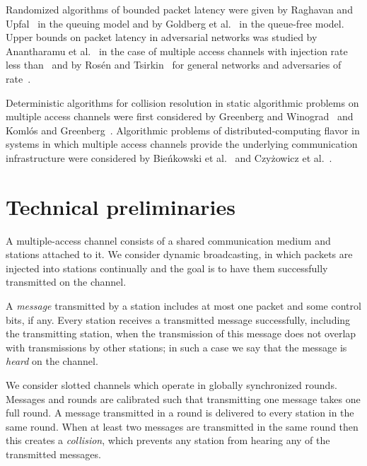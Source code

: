 \documentclass[11pt]{article}
\begin{document}
Randomized algorithms of bounded packet latency were given by Raghavan and Upfal~\cite{RaghavanU-SICOMP98} in the queuing model and by Goldberg et al.~\cite{GoldbergMPS-JACM00} in the queue-free model.
Upper bounds on packet latency in adversarial networks was studied by Anantharamu et al.~\cite{AnantharamuCKR-INFOCOM10,AnantharamuCKR-SIROCCO11} in the case of multiple access channels with injection rate less than~ and by Ros{\'e}n and Tsirkin~\cite{RosenT06} for general networks and adversaries of rate~.

Deterministic algorithms for collision resolution in static algorithmic problems on multiple access channels were first considered by Greenberg and Winograd~\cite{GreenbergW-JACM85} and Koml{\'o}s and Greenberg~\cite{KomlosG-TIT85}.
Algorithmic problems of distributed-computing flavor in systems in which multiple access channels provide the underlying communication infrastructure were considered by Bie\'nkowski et al.~\cite{BienkowskiKKK-STACS10} and Czy\.zowicz et al.~\cite{CzyzowiczGKP11}.




\section{Technical preliminaries}

\label{sec:preliminaries}




A multiple-access channel consists of a shared communication medium and stations attached to it.
We consider dynamic broadcasting, in which packets are injected into stations continually and the goal is to have them successfully transmitted on the channel.


A \emph{message} transmitted by a station includes at most one packet and some control bits, if any.
Every station receives a transmitted message successfully, including the transmitting station, when the transmission of this message does not overlap with transmissions by other stations; in such a case we say that the message is \emph{heard} on the channel.

We consider slotted channels which operate in globally synchronized rounds.
Messages and rounds are calibrated such that transmitting one message takes one full round.
A message transmitted in a round is delivered to every station in the same round.
When at least two messages are transmitted in the same round then this creates a \emph{collision}, which prevents any station from hearing any of the transmitted messages. 
\end{document}
